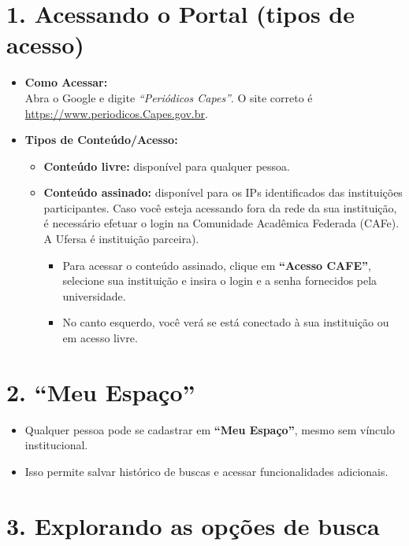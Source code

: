 \documentclass[
  letterpaper,
  DIV=11,
  numbers=noendperiod]{scrreprt}
\providecommand{\tightlist}{%
  \setlength{\itemsep}{0pt}\setlength{\parskip}{0pt}}
\begin{document}
\section{1. Acessando o Portal (tipos de
acesso)}\label{acessando-o-portal-tipos-de-acesso}

\begin{itemize}
\item
  \textbf{Como Acessar:}\\
  Abra o Google e digite \emph{``Periódicos Capes''}. O site correto é
  \url{https://www.periodicos.Capes.gov.br}.
\item
  \textbf{Tipos de Conteúdo/Acesso:}

  \begin{itemize}
  \tightlist
  \item
    \textbf{Conteúdo livre:} disponível para qualquer pessoa.
  \item
    \textbf{Conteúdo assinado:} disponível para os IPs identificados das
    instituições participantes. Caso você esteja acessando fora da rede
    da sua instituição, é necessário efetuar o login na Comunidade
    Acadêmica Federada (CAFe). A Ufersa é instituição parceira).

    \begin{itemize}
    \tightlist
    \item
      Para acessar o conteúdo assinado, clique em \textbf{``Acesso
      CAFE''}, selecione sua instituição e insira o login e a senha
      fornecidos pela universidade.
    \item
      No canto esquerdo, você verá se está conectado à sua instituição
      ou em acesso livre.
    \end{itemize}
  \end{itemize}
\end{itemize}

\section{2. ``Meu Espaço''}\label{meu-espauxe7o}

\begin{itemize}
\tightlist
\item
  Qualquer pessoa pode se cadastrar em \textbf{``Meu Espaço''}, mesmo
  sem vínculo institucional.
\item
  Isso permite salvar histórico de buscas e acessar funcionalidades
  adicionais.
\end{itemize}

\section{3. Explorando as opções de
busca}\label{explorando-as-opuxe7uxf5es-de-busca}
\end{document}
